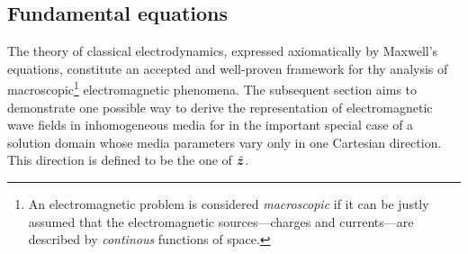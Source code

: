 \subsection{Fundamental equations}
\label{subsec:em_fundamental_equations}

The theory of classical electrodynamics, expressed axiomatically by Maxwell's
equations, constitute an accepted and well-proven framework for thy analysis of
macroscopic\footnote{An electromagnetic problem is considered \emph{macroscopic}
if it can be justly assumed that the electromagnetic sources---charges and
currents---are described by \emph{continous} functions of space.}
electromagnetic phenomena.
The subsequent section aims to demonstrate one possible way to derive the
representation of electromagnetic wave fields in inhomogeneous media for in the
important special case of a solution domain whose media parameters vary only in
one Cartesian direction.
This direction is defined to be the one of $\uv{z}$.

